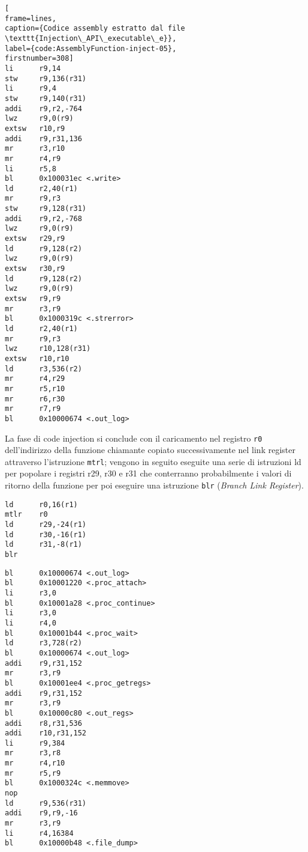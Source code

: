 \documentclass[10pt,a4paper, titlepage]{report}
\begin{document}
\begin{lstlisting}
[
frame=lines, 
caption={Codice assembly estratto dal file \texttt{Injection\_API\_executable\_e}}, 
label={code:AssemblyFunction-inject-05},
firstnumber=308]
li      r9,14
stw     r9,136(r31)
li      r9,4
stw     r9,140(r31)
addi    r9,r2,-764
lwz     r9,0(r9)
extsw   r10,r9
addi    r9,r31,136
mr      r3,r10
mr      r4,r9
li      r5,8
bl      0x100031ec <.write>
ld      r2,40(r1)
mr      r9,r3
stw     r9,128(r31)
addi    r9,r2,-768
lwz     r9,0(r9)
extsw   r29,r9
ld      r9,128(r2)
lwz     r9,0(r9)
extsw   r30,r9
ld      r9,128(r2)
lwz     r9,0(r9)
extsw   r9,r9
mr      r3,r9
bl      0x1000319c <.strerror>
ld      r2,40(r1)
mr      r9,r3
lwz     r10,128(r31)
extsw   r10,r10
ld      r3,536(r2)
mr      r4,r29
mr      r5,r10
mr      r6,r30
mr      r7,r9
bl      0x10000674 <.out_log>
\end{lstlisting}

La fase di code injection si conclude con il caricamento nel registro \texttt{r0} dell'indirizzo della funzione chiamante copiato successivamente nel link register attraverso l'istruzione \texttt{mtrl}; vengono in seguito eseguite una serie di istruzioni ld per popolare i registri r29, r30 e r31 che conterranno probabilmente i valori di ritorno della funzione per poi eseguire una istruzione \texttt{blr} (\textit{Branch Link Register}).

\begin{lstlisting}
ld      r0,16(r1)
mtlr    r0
ld      r29,-24(r1)
ld      r30,-16(r1)
ld      r31,-8(r1)
blr
\end{lstlisting}


\begin{lstlisting}
bl      0x10000674 <.out_log>
bl      0x10001220 <.proc_attach>
li      r3,0
bl      0x10001a28 <.proc_continue>
li      r3,0
li      r4,0
bl      0x10001b44 <.proc_wait>
ld      r3,728(r2)
bl      0x10000674 <.out_log>
addi    r9,r31,152
mr      r3,r9
bl      0x10001ee4 <.proc_getregs>
addi    r9,r31,152
mr      r3,r9
bl      0x10000c80 <.out_regs>
addi    r8,r31,536
addi    r10,r31,152
li      r9,384
mr      r3,r8
mr      r4,r10
mr      r5,r9
bl      0x1000324c <.memmove>
nop
ld      r9,536(r31)
addi    r9,r9,-16
mr      r3,r9
li      r4,16384
bl      0x10000b48 <.file_dump>
\end{lstlisting}
\end{document}
